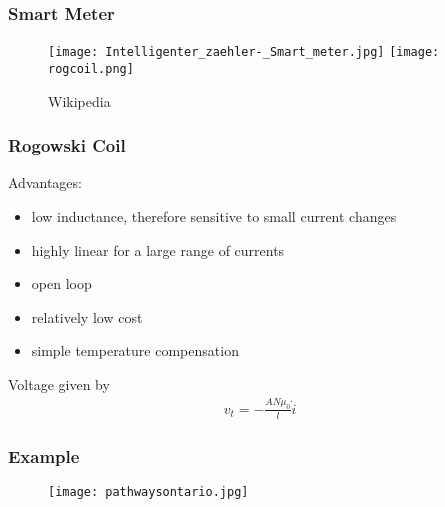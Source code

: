\documentclass[10pt,aspectratio=169,dvipsnames]{beamer}
\let\olditem\item
\renewcommand{\item}{%
\olditem\vspace{5pt}}
\begin{document}
%

\begin{frame}
  \frametitle{Smart Meter}
  \begin{figure}
     \texttt{[image: Intelligenter\_zaehler-\_Smart\_meter.jpg]}
      \texttt{[image: rogcoil.png]}
  \caption{Wikipedia}
  \end{figure}


\end{frame}
\begin{frame}
 \frametitle{Rogowski Coil}
 Advantages:
 \begin{itemize}
  \item low inductance, therefore sensitive to small current changes
  \item highly linear for a large range of currents
  \item open loop
  \item relatively low cost
  \item simple temperature compensation
 \end{itemize}
 Voltage given by
 \begin{align*}
  v_t = - \frac{A N \mu_0}{l} \dot{i}
 \end{align*}

\end{frame}

\begin{frame}
 \frametitle{Example}
  \begin{figure}
     \texttt{[image: pathwaysontario.jpg]}

  \end{figure}

\end{frame}
\end{document}
